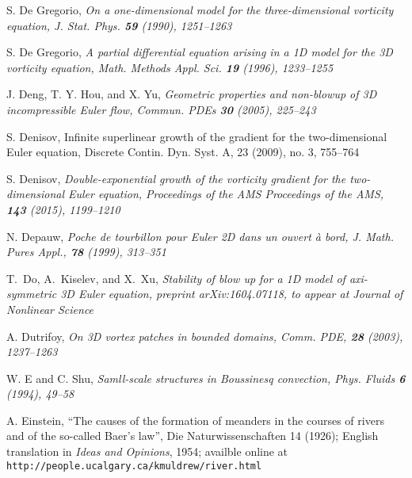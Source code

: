 \documentclass[reqno,centertags, 11pt]{amsart}
\begin{document}
\begin{thebibliography}{99}
 S. De Gregorio, \it On a one-dimensional model for the three-dimensional vorticity equation, \rm J. Stat. Phys. {\bf 59} (1990), 1251--1263

 S. De Gregorio, \it A partial differential equation arising in a 1D model for the 3D vorticity equation, \rm Math. Methods Appl. Sci. {\bf 19} (1996), 1233--1255

 J. Deng, T. Y. Hou, and X. Yu, \it Geometric properties and non-blowup of 3D incompressible Euler
flow, \rm Commun. PDEs {\bf 30} (2005), 225--243

 S. Denisov, Infinite superlinear growth of the gradient for the two-dimensional Euler equation,
Discrete Contin. Dyn. Syst. A, 23 (2009), no. 3, 755--764

 S. Denisov, \it
Double-exponential growth of the vorticity gradient for the two-dimensional Euler equation, \rm Proceedings of the AMS
Proceedings of the AMS, {\bf 143} (2015), 1199--1210

 N. Depauw, \it Poche de tourbillon pour Euler 2D dans un
  ouvert \`a bord, \rm J. Math. Pures Appl., {\bf 78} (1999), 313--351


 T.~Do, A.~Kiselev, and X.~Xu, \it Stability of blow up for a 1D model of axi-symmetric 3D Euler equation, \rm preprint arXiv:1604.07118, to appear at Journal of Nonlinear Science



 A. Dutrifoy, \it On 3D vortex patches in bounded domains,
 \rm  Comm. PDE,
{\bf 28} (2003), 1237--1263

 W. E and C. Shu, \it Samll-scale structures in Boussinesq convection, \rm Phys. Fluids {\bf 6}
(1994), 49--58

A. Einstein, ``The causes of the formation of meanders in the courses of rivers and of the so-called Baer's law'', Die Naturwissenschaften 14 (1926); English translation in {\sl Ideas and Opinions},
1954; availble online at {\tt http://people.ucalgary.ca/$\tilde{ }$kmuldrew/river.html}


\end{thebibliography}
\end{document}

